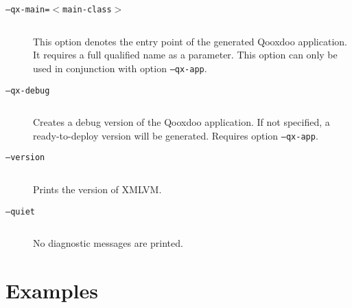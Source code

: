 \documentclass[12pt]{article}
\begin{document}
\begin{description}
\item[\texttt{--qx-main=$<$main-class$>$}] $ $

  This option denotes the entry point of the generated Qooxdoo
  application. It requires a full qualified name as a parameter. This
  option can only be used in conjunction with option
  \texttt{--qx-app}.

\item[\texttt{--qx-debug}] $ $

  Creates a debug version of the Qooxdoo application.  If not
  specified, a ready-to-deploy version will be generated.  Requires
  option \texttt{--qx-app}.

\item[\texttt{--version}] $ $

  Prints the version of XMLVM.

\item[\texttt{--quiet}] $ $

  No diagnostic messages are printed.

\end{description}


\section{Examples}
\end{document}
